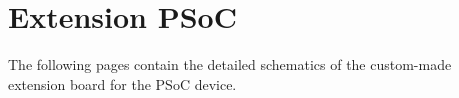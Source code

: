 \section{Extension PSoC}
\label{app:extension_psoc}

The following pages contain the detailed schematics of the custom-made extension board for the PSoC device. 

